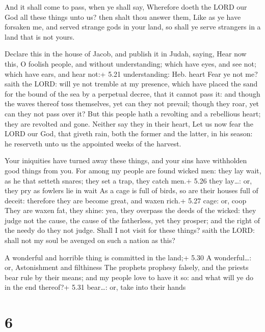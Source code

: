  And it shall come to pass, when ye shall say, Wherefore
doeth the LORD our God all these things unto us? then shalt thou answer
them, Like as ye have forsaken me, and served strange gods in your land,
so shall ye serve strangers in a land that is not yours.

 Declare this in the house of Jacob, and publish it in
Judah, saying,  Hear now this, O foolish people, and
without understanding; which have eyes, and see not; which have ears,
and hear not:+ 5.21 understanding: Heb. heart  Fear ye not
me? saith the LORD: will ye not tremble at my presence, which have
placed the sand for the bound of the sea by a perpetual decree, that it
cannot pass it: and though the waves thereof toss themselves, yet can
they not prevail; though they roar, yet can they not pass over it?
 But this people hath a revolting and a rebellious heart;
they are revolted and gone.  Neither say they in their
heart, Let us now fear the LORD our God, that giveth rain, both the
former and the latter, in his season: he reserveth unto us the appointed
weeks of the harvest.

 Your iniquities have turned away these things, and your
sins have withholden good things from you.  For among my
people are found wicked men: they lay wait, as he that setteth snares;
they set a trap, they catch men.+ 5.26 they lay\ldots: or, they pry as
fowlers lie in wait  As a cage is full of birds, so are
their houses full of deceit: therefore they are become great, and waxen
rich.+ 5.27 cage: or, coop  They are waxen fat, they shine:
yea, they overpass the deeds of the wicked: they judge not the cause,
the cause of the fatherless, yet they prosper; and the right of the
needy do they not judge.  Shall I not visit for these
things? saith the LORD: shall not my soul be avenged on such a nation as
this?

 A wonderful and horrible thing is committed in the
land;+ 5.30 A wonderful\ldots: or, Astonishment and filthiness
 The prophets prophesy falsely, and the priests bear rule
by their means; and my people love to have it so: and what will ye do in
the end thereof?+ 5.31 bear\ldots: or, take into their hands

\hypertarget{section-5}{%
\section{6}\label{section-5}}

